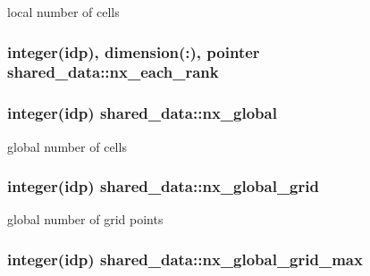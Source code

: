 local number of cells 

\subsubsection[{\texorpdfstring{nx\+\_\+each\+\_\+rank}{nx_each_rank}}]{\setlength{\rightskip}{0pt plus 5cm}integer(idp), dimension(\+:), pointer shared\+\_\+data\+::nx\+\_\+each\+\_\+rank}\hypertarget{namespaceshared__data_a9ea44b080aed4db2eaa320878f266ace}{}\label{namespaceshared__data_a9ea44b080aed4db2eaa320878f266ace}
\subsubsection[{\texorpdfstring{nx\+\_\+global}{nx_global}}]{\setlength{\rightskip}{0pt plus 5cm}integer(idp) shared\+\_\+data\+::nx\+\_\+global}\hypertarget{namespaceshared__data_aacbd3bff423894ff20cec97f4286ba68}{}\label{namespaceshared__data_aacbd3bff423894ff20cec97f4286ba68}


global number of cells 

\subsubsection[{\texorpdfstring{nx\+\_\+global\+\_\+grid}{nx_global_grid}}]{\setlength{\rightskip}{0pt plus 5cm}integer(idp) shared\+\_\+data\+::nx\+\_\+global\+\_\+grid}\hypertarget{namespaceshared__data_a57f53cc0b24ace5f77db7a6a1835f7fb}{}\label{namespaceshared__data_a57f53cc0b24ace5f77db7a6a1835f7fb}


global number of grid points 

\subsubsection[{\texorpdfstring{nx\+\_\+global\+\_\+grid\+\_\+max}{nx_global_grid_max}}]{\setlength{\rightskip}{0pt plus 5cm}integer(idp) shared\+\_\+data\+::nx\+\_\+global\+\_\+grid\+\_\+max}\hypertarget{namespaceshared__data_a038972078d665e998a4c47bb38b27170}{}\label{namespaceshared__data_a038972078d665e998a4c47bb38b27170}
